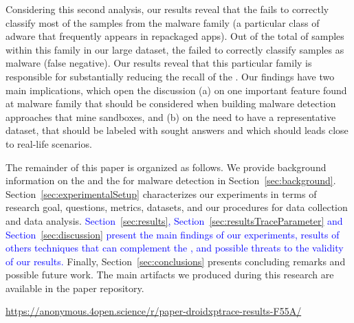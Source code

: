 Considering this second analysis, our results reveal that the \mas fails to correctly classify most of the samples from
the \gps malware family (a particular class of adware that frequently appears in repackaged apps). 
Out of the total of \appsGps samples within this family in our large dataset, the \mas failed to correctly classify \appsGpsFN samples as malware (false negative).
Our results reveal that this particular family is responsible for substantially reducing the recall of the \mas.
Our findings have two main implications, which open the discussion (a) on one important feature found at \gps malware family that should be
considered when building malware detection approaches that mine sandboxes, and (b) on the need to have a representative dataset, that should be labeled with sought
answers and which should leads close to real-life scenarios.
  

%


The remainder of this paper is organized as follows. 
We provide background information on the \mas and the \mas for malware detection in
Section~\ref{sec:background}. Section~\ref{sec:experimentalSetup}
characterizes our experiments in terms of research goal, questions, metrics, datasets, and our procedures for data collection and data analysis. \textcolor{blue}{Section~\ref{sec:results}, Section~\ref{sec:resultsTraceParameter} and Section~\ref{sec:discussion} present the main findings of our experiments, results of others techniques that can complement the \mas, and possible threats to the validity of our results.} Finally,
Section~\ref{sec:conclusions} presents concluding remarks and possible future
work. The main artifacts we produced during this research are available in the
paper repository.

\begin{small}
  \begin{center}
    \url{https://anonymous.4open.science/r/paper-droidxptrace-results-F55A/}
  \end{center}
\end{small}
